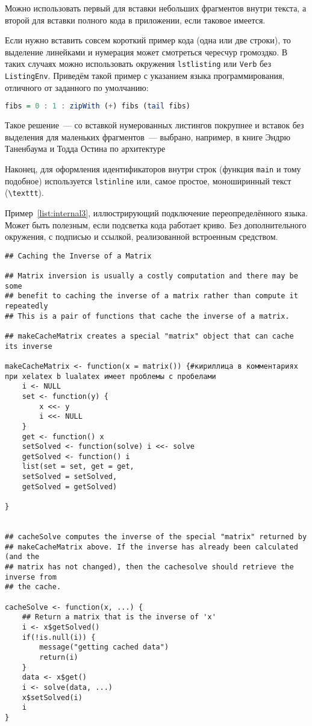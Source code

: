 Можно использовать первый для вставки небольших фрагментов
внутри текста, а второй для вставки полного
кода в приложении, если таковое имеется.

Если нужно вставить совсем короткий пример кода (одна или две строки), то выделение  линейками и нумерация может смотреться чересчур громоздко. В таких случаях можно использовать окружения \texttt{lstlisting} или \texttt{Verb} без \texttt{ListingEnv}. Приведём такой пример с указанием языка программирования, отличного от заданного по умолчанию:
\begin{lstlisting}[language=Haskell]
fibs = 0 : 1 : zipWith (+) fibs (tail fibs)
\end{lstlisting}
Такое решение~--- со вставкой нумерованных листингов покрупнее
и вставок без выделения для маленьких фрагментов~--- выбрано,
например, в книге Эндрю Таненбаума и Тодда Остина по архитектуре

Наконец, для оформления идентификаторов внутри строк
(функция \lstinline{main} и тому подобное) используется
\texttt{lstinline} или, самое простое, моноширинный текст
(\texttt{\textbackslash texttt}).


Пример~\ref{list:internal3}, иллюстрирующий подключение переопределённого языка. Может быть полезным, если подсветка кода работает криво. Без дополнительного окружения, с подписью и ссылкой, реализованной встроенным средством.
\begin{lstlisting}[language={Renhanced},caption={Пример листинга c подписью собственными средствами},label={list:internal3}]
## Caching the Inverse of a Matrix

## Matrix inversion is usually a costly computation and there may be some
## benefit to caching the inverse of a matrix rather than compute it repeatedly
## This is a pair of functions that cache the inverse of a matrix.

## makeCacheMatrix creates a special "matrix" object that can cache its inverse

makeCacheMatrix <- function(x = matrix()) {#кириллица в комментариях при xelatex b lualatex имеет проблемы с пробелами
    i <- NULL
    set <- function(y) {
        x <<- y
        i <<- NULL
    }
    get <- function() x
    setSolved <- function(solve) i <<- solve
    getSolved <- function() i
    list(set = set, get = get,
    setSolved = setSolved,
    getSolved = getSolved)
    
}


## cacheSolve computes the inverse of the special "matrix" returned by
## makeCacheMatrix above. If the inverse has already been calculated (and the
## matrix has not changed), then the cachesolve should retrieve the inverse from
## the cache.

cacheSolve <- function(x, ...) {
    ## Return a matrix that is the inverse of 'x'
    i <- x$getSolved()
    if(!is.null(i)) {
        message("getting cached data")
        return(i)
    }
    data <- x$get()
    i <- solve(data, ...)
    x$setSolved(i)
    i  
}
\end{lstlisting}

